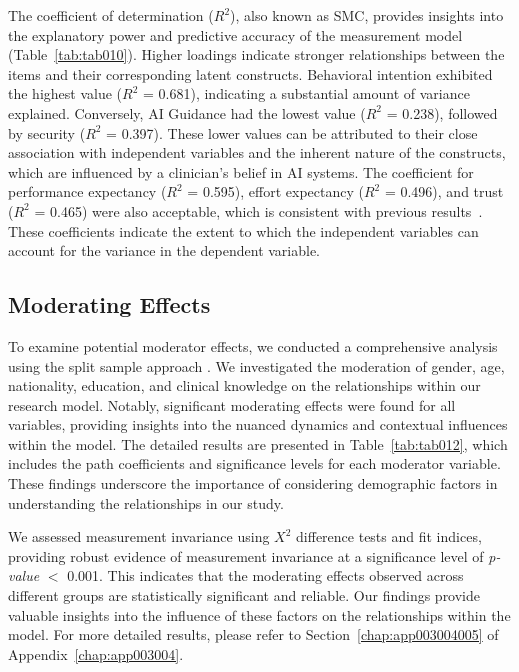 The coefficient of determination ($R^2$), also known as \ac{SMC}, provides insights into the explanatory power and predictive accuracy of the measurement model (Table~\ref{tab:tab010}).
Higher loadings indicate stronger relationships between the items and their corresponding latent constructs.
Behavioral intention exhibited the highest value ($R^2$ = 0.681), indicating a substantial amount of variance explained.
Conversely, \ac{AI} Guidance had the lowest value ($R^2$ = 0.238), followed by security ($R^2$ = 0.397).
These lower values can be attributed to their close association with independent variables and the inherent nature of the constructs, which are influenced by a clinician's belief in \ac{AI} systems.
The coefficient for performance expectancy ($R^2$ = 0.595), effort expectancy ($R^2$ = 0.496), and trust ($R^2$ = 0.465) were also acceptable, which is consistent with previous results~\cite{KHALILZADEH2017460}.
These coefficients indicate the extent to which the independent variables can account for the variance in the dependent variable.

\subsection{Moderating Effects}
\label{sec:chap004005005}

To examine potential moderator effects, we conducted a comprehensive analysis using the split sample approach \cite{LI2021106581, LI2021106929}.
We investigated the moderation of gender, age, nationality, education, and clinical knowledge on the relationships within our research model.
Notably, significant moderating effects were found for all variables, providing insights into the nuanced dynamics and contextual influences within the model.
The detailed results are presented in Table~\ref{tab:tab012}, which includes the path coefficients and significance levels for each moderator variable.
These findings underscore the importance of considering demographic factors in understanding the relationships in our study.



We assessed measurement invariance using $X^2$ difference tests and fit indices, providing robust evidence of measurement invariance at a significance level of {\it p-value} $<$ 0.001.
This indicates that the moderating effects observed across different groups are statistically significant and reliable.
Our findings provide valuable insights into the influence of these factors on the relationships within the model.
For more detailed results, please refer to Section~\ref{chap:app003004005} of Appendix~\ref{chap:app003004}.

